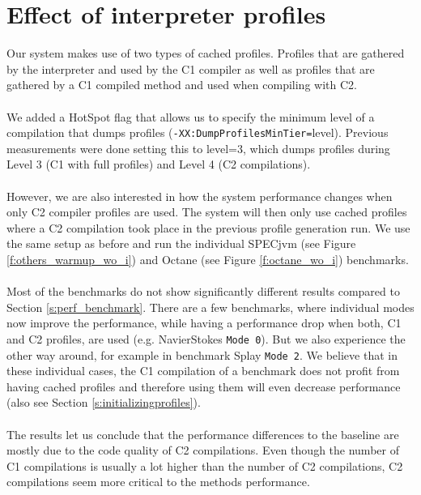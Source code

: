 \section{Effect of interpreter profiles}
\label{s:perf_interpreter_profiles}
Our system makes use of two types of cached profiles. Profiles that are gathered by the interpreter and used by the C1 compiler as well as profiles that are gathered by a C1 compiled method and used when compiling with C2.
\\\\
We added a HotSpot flag that allows us to specify the minimum level of a compilation that dumps profiles (\texttt{-XX:DumpProfilesMinTier=}level).
Previous measurements were done setting this to level=3, which dumps profiles during Level 3 (C1 with full profiles) and Level 4 (C2 compilations).
\\\\
However, we are also interested in how the system performance changes when only C2 compiler profiles are used. The system will then only use cached profiles where a C2 compilation took place in the previous profile generation run. We use the same setup as before and run the individual SPECjvm (see Figure \ref{f:others_warmup_wo_i}) and Octane (see Figure \ref{f:octane_wo_i}) benchmarks. 
\\\\
Most of the benchmarks do not show significantly different results compared to Section \ref{s:perf_benchmark}. There are a few benchmarks, where individual modes now improve the performance, while having a performance drop when both, C1 and C2 profiles, are used (e.g. NavierStokes \texttt{Mode 0}). But we also experience the other way around, for example in benchmark Splay \texttt{Mode 2}. We believe that in these individual cases, the C1 compilation of a benchmark does not profit from having cached profiles and therefore using them will even decrease performance (also see Section \ref{s:initializingprofiles}).
\\\\
The results let us conclude that the performance differences to the baseline are mostly due to the code quality of C2 compilations. Even though the number of C1 compilations is usually a lot higher than the number of C2 compilations, C2 compilations seem more critical to the methods performance.
